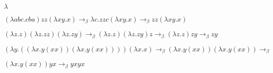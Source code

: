 \documentclass[10pt]{book}
\begin{document}
\begin{mdSnippets}
\begin{mdInlineSnippet}[c6a6eb61fd9c6c913da73b3642ca147d]%
$\lambda$\end{mdInlineSnippet}%
\begin{mdInlineSnippet}[724dee6c795060513581b73b833ad681]%
$(\lambda abc.cba)zz(\lambda xy.x) \rightarrow_\beta \lambda c.zzc(\lambda xy.x) \rightarrow_\beta zz(\lambda xy.x)$\end{mdInlineSnippet}%
\begin{mdInlineSnippet}%
$(\lambda z.z)(\lambda z.zz)(\lambda z.zy) \rightarrow_\beta (\lambda z.z)(\lambda z.zy)z \rightarrow_\beta (\lambda z.z)zy \rightarrow_\beta zy$\end{mdInlineSnippet}%
\begin{mdInlineSnippet}[483965e49a49fb15b51c67b957226d04]%
$(\lambda y. ((\lambda x. y(xx)) (\lambda x. y(xx)))) (\lambda x.x) \rightarrow_\beta (\lambda x.y(xx)) (\lambda x.y(xx)) \rightarrow_\beta $\end{mdInlineSnippet}%
\begin{mdInlineSnippet}[5c2896d630ddbf5b6808ef2e91114497]%
$ (\lambda x.y(xx))yx \rightarrow _\beta yxyx $\end{mdInlineSnippet}%

\end{mdSnippets}
\end{document}
